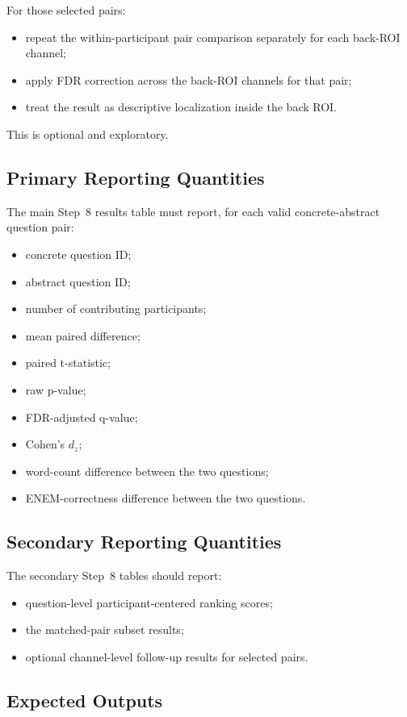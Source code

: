 For those selected pairs:
\begin{itemize}
    \item repeat the within-participant pair comparison separately for each back-ROI channel;
    \item apply FDR correction across the back-ROI channels for that pair;
    \item treat the result as descriptive localization inside the back ROI.
\end{itemize}

This is optional and exploratory.

\subsection{Primary Reporting Quantities}
The main Step~8 results table must report, for each valid concrete-abstract question pair:
\begin{itemize}
    \item concrete question ID;
    \item abstract question ID;
    \item number of contributing participants;
    \item mean paired difference;
    \item paired t-statistic;
    \item raw p-value;
    \item FDR-adjusted q-value;
    \item Cohen's \(d_z\);
    \item word-count difference between the two questions;
    \item ENEM-correctness difference between the two questions.
\end{itemize}

\subsection{Secondary Reporting Quantities}
The secondary Step~8 tables should report:
\begin{itemize}
    \item question-level participant-centered ranking scores;
    \item the matched-pair subset results;
    \item optional channel-level follow-up results for selected pairs.
\end{itemize}

\subsection{Expected Outputs}

